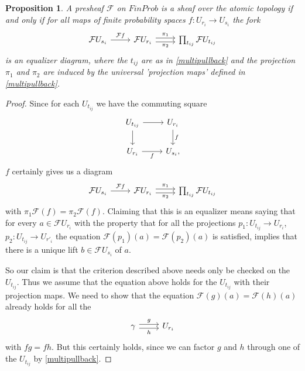 \documentclass[a4paper]{amsproc}
\theoremstyle{plain}
\newtheorem{proposition}[theorem]{Proposition}
\theoremstyle{definition}
\theoremstyle{remark}
\numberwithin{equation}{section}
\begin{document}
\begin{proposition} \label{sheaf_condition}
A presheaf $\mathcal{F}$ on $FinProb$ is a sheaf over the atomic topology if and only if for all maps of finite probability spaces $f: U_{r_i} \to U_{s_i}$ the fork
\[
\begin{tikzcd}
\mathcal{F} U_{s_i} \arrow[r, "\mathcal{F}f"] & 
\mathcal{F} U_{r_i} \arrow[r, "\pi_1", shift left] \arrow[r, "\pi_2"', shift right] & \prod_{t_{ij}} \mathcal{F} U_{t_{ij}}
\end{tikzcd}
\]
is an equalizer diagram, where the $t_{ij}$ are as in \ref{multipullback} and the projection $\pi_1$ and $\pi_2$ are induced by the universal 'projection maps' defined in \ref{multipullback}.
\end{proposition}
\begin{proof}
Since for each $U_{t_{ij}}$ we have the commuting square
\[
\begin{tikzcd}
U_{t_{ij}} \arrow[r] \arrow[d] & {U_{r_i}} \arrow[d, "f"] \\
{U_{r_i}} \arrow[r, "f"']            & {U_{s_i}} ,
\end{tikzcd}
\]
$f$ certainly gives us a diagram
\[
\begin{tikzcd}
\mathcal{F} U_{s_i} \arrow[r, "\mathcal{F}f"] & \mathcal{F} U_{r_i} \arrow[r, "\pi_1", shift left] \arrow[r, "\pi_2"', shift right] & \prod_{t_{ij}} \mathcal{F} U_{t_{ij}}
\end{tikzcd}
\]
with $\pi_1 \mathcal{F}(f) = \pi_2 \mathcal{F}(f)$. Claiming that this is an equalizer means saying that for every $a \in \mathcal{F}U_{r_i}$ with the property that for all the projections $p_1: U_{t_{ij}} \to U_{r_i}$, $p_2: U_{t_{ij}} \to U_{r'_i}$ the equation $\mathcal{F}(p_1)(a) = \mathcal{F}(p_2)(a)$ is satisfied, implies that there is a unique lift $b \in \mathcal{F}U_{s_i}$ of $a$.

So our claim is that the criterion described above needs only be checked on the $U_{t_{ij}}$. Thus we assume that the equation above holds for the $U_{t_{ij}}$ with their projection maps. We need to show that the equation $\mathcal{F}(g)(a) = \mathcal{F}(h)(a)$ already holds for all the \[
\begin{tikzcd}
\gamma \arrow[r, "g", shift left] \arrow[r, "h"', shift right] & U_{r_i}
\end{tikzcd}
\]
with $fg = fh$. But this certainly holds, since we can factor $g$ and $h$ through one of the $U_{t_{ij}}$ by \ref{multipullback}.
\end{proof}
\end{document}
